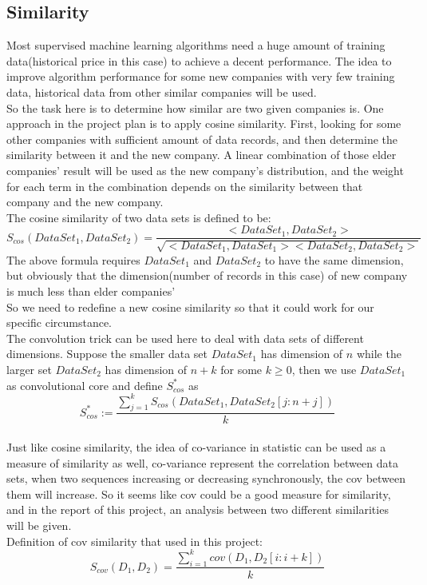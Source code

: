 \documentclass[11pt]{report}
\begin{document}
\subsection{Similarity}
Most supervised machine learning algorithms need a huge amount of training data(historical price in this case) to achieve a decent performance. The idea to improve algorithm performance for some new companies with very few training data, historical data from other similar companies will be used.\\
So the task here is to determine how similar are two given companies is. One approach in the project plan is to apply cosine similarity. First, looking for some other companies with sufficient amount of data records, and then determine the similarity between it and the new company. A linear combination of those elder companies' result will be used as the new company's distribution, and the weight for each term in the combination depends on the similarity between that company and the new company.\\
The cosine similarity of two data sets is defined to be:
$$S_{cos}({DataSet}_1,{DataSet}_2) = \frac{<{DataSet}_1,{DataSet}_2>}{\sqrt{<{DataSet}_1,{DataSet}_1><{DataSet}_2,{DataSet}_2>}}$$
The above formula requires ${DataSet}_1$ and ${DataSet}_2$ to have the same dimension, but obviously that the dimension(number of records in this case) of new company is much less than elder companies'\\
So we need to redefine a new cosine similarity so that it could work for our specific circumstance.\\
The convolution trick can be used here to deal with data sets of different dimensions.
Suppose the smaller data set ${DataSet}_1$ has dimension of $n$ while the larger set ${DataSet}_2$ has dimension of $n+k$ for some $k\geq 0$, then we use ${DataSet}_1$ as convolutional core and define $S^{*}_{cos}$ as
$$S^{*}_{cos} := \frac{\sum_{j=1}^{k}{S_{cos}({DataSet}_1,{DataSet}_2[j:n+j])}}{k} $$\\
Just like cosine similarity, the idea of co-variance in statistic can be used as a measure of similarity as well, co-variance represent the correlation between data sets, when two sequences increasing or decreasing synchronously, the cov between them will increase. So it seems like cov could be a good measure for similarity, and in the report of this project, an analysis between two different similarities will be given.\\
Definition of cov similarity that used in this project:
$$S_{cov}(D_1,D_2) = \frac{\sum_{i=1}^{k}{cov(D_1,D_2[i:i+k])}}{k}$$
\end{document}
